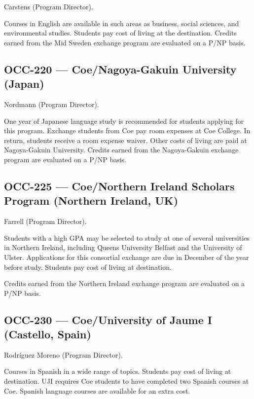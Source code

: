 \documentclass[
  letterpaper,
]{scrbook}
\begin{document}
Carstens (Program Director).

Courses in English are available in such areas as business, social
sciences, and environmental studies. Students pay cost of living at the
destination. Credits earned from the Mid Sweden exchange program are
evaluated on a P/NP basis.

\subsection{OCC-220 --- Coe/Nagoya-Gakuin University
(Japan)}\label{occ-220-coenagoya-gakuin-university-japan}

Nordmann (Program Director).

One year of Japanese language study is recommended for students applying
for this program. Exchange students from Coe pay room expenses at Coe
College. In return, students receive a room expense waiver. Other costs
of living are paid at Nagoya-Gakuin University. Credits earned from the
Nagoya-Gakuin exchange program are evaluated on a P/NP basis.

\subsection{OCC-225 --- Coe/Northern Ireland Scholars Program (Northern
Ireland,
UK)}\label{occ-225-coenorthern-ireland-scholars-program-northern-ireland-uk}

Farrell (Program Director).

Students with a high GPA may be selected to study at one of several
universities in Northern Ireland, including Queens University Belfast
and the University of Ulster. Applications for this consortial exchange
are due in December of the year before study. Students pay cost of
living at destination.

Credits earned from the Northern Ireland exchange program are evaluated
on a P/NP basis.

\subsection{OCC-230 --- Coe/University of Jaume I (Castello,
Spain)}\label{occ-230-coeuniversity-of-jaume-i-castello-spain}

Rodríguez Moreno (Program Director).

Courses in Spanish in a wide range of topics. Students pay cost of
living at destination. UJI requires Coe students to have completed two
Spanish courses at Coe. Spanish language courses are available for an
extra cost.
\end{document}
